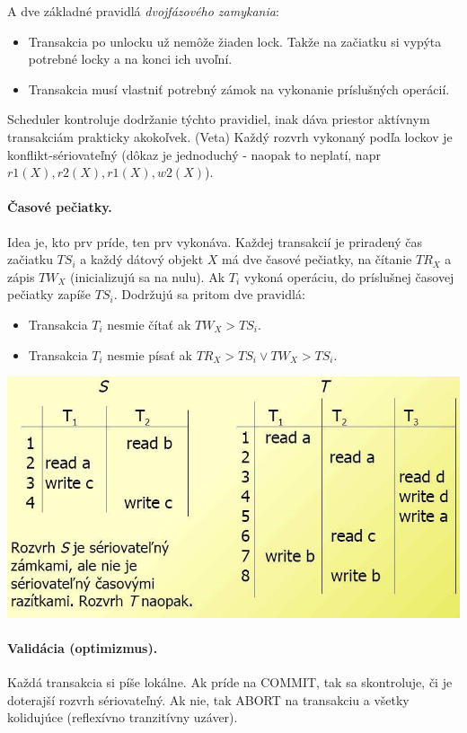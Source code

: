 \documentclass[10pt,a4paper]{article}
\begin{document}
A dve základné pravidlá \emph{dvojfázového zamykania}:
\begin{itemize}
\item Transakcia po unlocku už nemôže žiaden lock. Takže na začiatku si vypýta potrebné locky a na konci ich uvoľní.
\item Transakcia musí vlastniť potrebný zámok na vykonanie príslušných operácií.
\end{itemize}

Scheduler kontroluje dodržanie týchto pravidiel, inak dáva priestor aktívnym transakciám prakticky akokoľvek.
(Veta) Každý rozvrh vykonaný podľa lockov je konflikt-sériovateľný (dôkaz je jednoduchý - naopak to neplatí, napr $r1(X), r2(X), r1(X), w2(X)$).

\paragraph{Časové pečiatky.}
Idea je, kto prv príde, ten prv vykonáva.
Každej transakcií je priradený čas začiatku $TS_i$ a každý dátový objekt $X$ má dve časové pečiatky, na čítanie $TR_X$ a zápis $TW_X$ (inicializujú sa na nulu). Ak $T_i$ vykoná operáciu, do príslušnej časovej pečiatky zapíše $TS_i$. Dodržujú sa pritom dve pravidlá:
\begin{itemize}
\item Transakcia $T_i$ nesmie čítať ak $TW_X > TS_i$.
\item Transakcia $T_i$ nesmie písať ak $TR_X > TS_i \vee TW_X > TS_i$.
\end{itemize}

\begin{center}
\includegraphics[scale=0.5]{db_lock_ts.png}
\end{center}

\paragraph{Validácia (optimizmus).}
Každá transakcia si píše lokálne. Ak príde na COMMIT, tak sa skontroluje, či je doterajší rozvrh sériovateľný. Ak nie, tak ABORT na transakciu a všetky kolidujúce (reflexívno tranzitívny uzáver).
\end{document}
